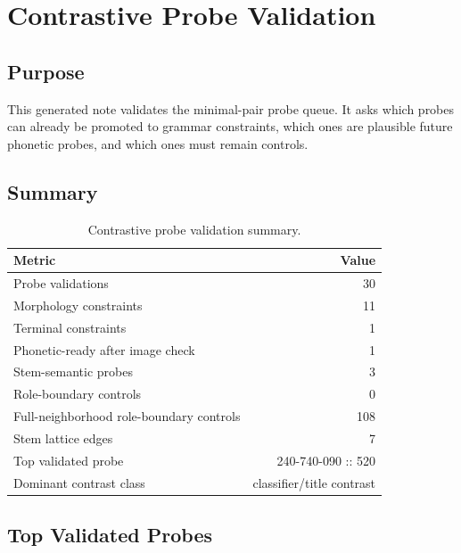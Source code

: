 \section{Contrastive Probe Validation}

\subsection{Purpose}

This generated note validates the minimal-pair probe queue. It asks which probes can already be promoted to grammar constraints, which ones are plausible future phonetic probes, and which ones must remain controls.

\subsection{Summary}

\begin{table}[htbp]
\centering
\begin{tabular}{p{}r}
\toprule
\textbf{Metric} & \textbf{Value} \\
\midrule
Probe validations & 30 \\
Morphology constraints & 11 \\
Terminal constraints & 1 \\
Phonetic-ready after image check & 1 \\
Stem-semantic probes & 3 \\
Role-boundary controls & 0 \\
Full-neighborhood role-boundary controls & 108 \\
Stem lattice edges & 7 \\
Top validated probe & 240-740-090 :: 520 \\
Dominant contrast class & classifier/title contrast \\
\bottomrule
\end{tabular}
\caption{Contrastive probe validation summary.}
\end{table}

\subsection{Top Validated Probes}

